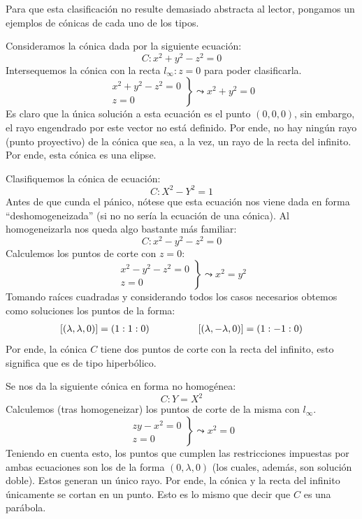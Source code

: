 Para que esta clasificación no resulte demasiado abstracta al lector, pongamos un ejemplos de cónicas de cada uno de los tipos.
\begin{exa}[Elipse]
	\label{C8_exa_elipse}
	Consideramos la cónica dada por la siguiente ecuación:
	\[C:x^2+y^2-z^2=0\]
	Intersequemos la cónica con la recta $l_\infty:z=0$ para poder clasificarla.
	\[\left.\begin{array}{c}
	x^2+y^2-z^2=0\\
	z=0
	\end{array}\right\}\leadsto x^2+y^2=0\]
	Es claro que la única solución a esta ecuación es el punto $(0,0,0)$, sin embargo, el rayo engendrado por este vector no está definido. Por ende, no hay ningún rayo (punto proyectivo) de la cónica que sea, a la vez, un rayo de la recta del infinito. Por ende, esta cónica es una elipse.
\end{exa}
\begin{exa}[Hipérbola]
	Clasifiquemos la cónica de ecuación:
	\[C:X^2-Y^2=1\]
	Antes de que cunda el pánico, nótese que esta ecuación nos viene dada en forma ``deshomogeneizada'' (si no no sería la ecuación de una cónica). Al homogeneizarla nos queda algo bastante más familiar:
	\[C:x^2-y^2-z^2=0\]
	Calculemos los puntos de corte con $z=0$:
	\[\left.\begin{array}{c}
	x^2-y^2-z^2=0\\
	z=0
	\end{array}\right\}\leadsto x^2=y^2\]
	Tomando raíces cuadradas y considerando todos los casos necesarios obtemos como soluciones los puntos de la forma:
	\[\begin{array}{cc}
	\left [ (\lambda,\lambda,0) \right ]=(1:1:0)\qquad & \qquad \left [ (\lambda,-\lambda,0) \right ]=(1:-1:0)
	\end{array}\]
	Por ende, la cónica $C$ tiene dos puntos de corte con la recta del infinito, esto significa que es de tipo hiperbólico.
\end{exa}
\begin{exa}[Parábola]
	Se nos da la siguiente cónica en forma no homogénea:
	\[C:Y=X^2\]
	Calculemos (tras homogeneizar) los puntos de corte de la misma con $l_\infty$.
	\[\left.\begin{array}{c}
	zy-x^2=0\\
	z=0
	\end{array}\right\}\leadsto x^2=0\]
	Teniendo en cuenta esto, los puntos que cumplen las restricciones impuestas por ambas ecuaciones son los de la forma $(0,\lambda,0)$ (los cuales, además, son solución doble). Estos generan un único rayo. Por ende, la cónica y la recta del infinito únicamente se cortan en un punto. Esto es lo mismo que decir que $C$ es una parábola.
\end{exa}
